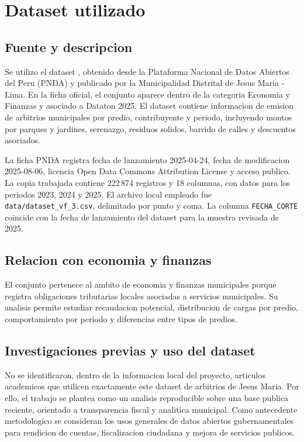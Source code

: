 \section{Dataset utilizado}
\label{sec:dataset}

\subsection{Fuente y descripcion}

Se utilizo el dataset \textit{\datasetname}, obtenido desde la Plataforma Nacional de Datos Abiertos del Peru (PNDA) y publicado por la Municipalidad Distrital de Jesus Maria - Lima. En la ficha oficial, el conjunto aparece dentro de la categoria Economia y Finanzas y asociado a Dataton 2025. El dataset contiene informacion de emision de arbitrios municipales por predio, contribuyente y periodo, incluyendo montos por parques y jardines, serenazgo, residuos solidos, barrido de calles y descuentos asociados.

La ficha PNDA registra fecha de lanzamiento 2025-04-24, fecha de modificacion 2025-08-06, licencia Open Data Commons Attribution License y acceso publico. La copia trabajada contiene 222\,874 registros y 18 columnas, con datos para los periodos 2023, 2024 y 2025. El archivo local empleado fue \texttt{data/dataset\_vf\_3.csv}, delimitado por punto y coma. La columna \texttt{FECHA\_CORTE} coincide con la fecha de lanzamiento del dataset para la muestra revisada de 2025.

\subsection{Relacion con economia y finanzas}

El conjunto pertenece al ambito de economia y finanzas municipales porque registra obligaciones tributarias locales asociadas a servicios municipales. Su analisis permite estudiar recaudacion potencial, distribucion de cargas por predio, comportamiento por periodo y diferencias entre tipos de predios.

\subsection{Investigaciones previas y uso del dataset}

No se identificaron, dentro de la informacion local del proyecto, articulos academicos que utilicen exactamente este dataset de arbitrios de Jesus Maria. Por ello, el trabajo se plantea como un analisis reproducible sobre una base publica reciente, orientado a transparencia fiscal y analitica municipal. Como antecedente metodologico se consideran los usos generales de datos abiertos gubernamentales para rendicion de cuentas, fiscalizacion ciudadana y mejora de servicios publicos.

